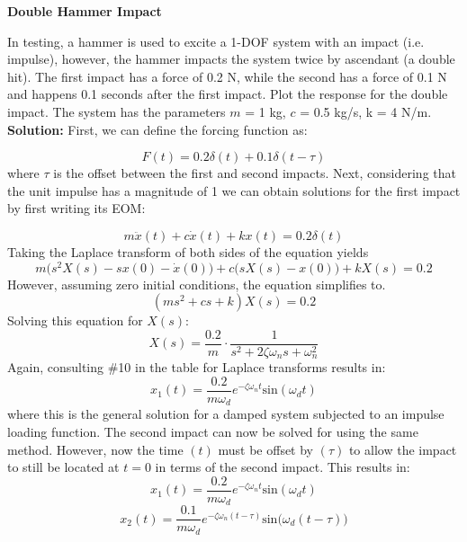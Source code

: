 \documentclass[12pt,letter]{article}
\begin{document}
\begin{example}
\label{example:Double_Hammer_Impact}
	\textbf{Double Hammer Impact}

	\noindent In testing, a hammer is used to excite a 1-DOF system with an impact (i.e. impulse), however, the hammer impacts the system twice by ascendant (a double hit). The first impact has a force of 0.2 N, while the second has a force of 0.1 N and happens 0.1 seconds after the first impact. Plot the response for the double impact. The system has the parameters $m$ = 1 kg, $c$ = 0.5 kg/s, k = 4 N/m. \\
	
	\noindent\textbf{Solution:} 
	\noindent First, we can define the forcing function as:
	
	\begin{equation}
		F(t) = 0.2 \delta (t) + 0.1 \delta(t-\tau)
	\end{equation}
	where $\tau$ is the offset between the first and second impacts. Next, considering that the unit impulse has a magnitude of 1 we can obtain solutions for the first impact by first writing its EOM:
	
	\begin{equation}
		m\ddot{x}(t) +c\dot{x}(t) +kx(t) =0.2 \delta(t)
	\end{equation}
	Taking the Laplace transform of both sides of the equation yields 
	\begin{equation}
		m\big(s^2X(s)-sx(0) - \dot{x}(0)\big) + c\big(sX(s)-x(0)\big) +kX(s) = 0.2
	\end{equation}
	However, assuming zero initial conditions, the equation simplifies to. 
	\begin{equation}
		(ms^2 + cs +k)X(s) = 0.2
	\end{equation}
	Solving this equation for $X(s)$:
	\begin{equation}
		X(s) = \frac{0.2}{m} \cdot \frac{1}{s^2 + 2 \zeta \omega_n s + \omega_n^2}
	\end{equation}
	Again, consulting \#10 in the table for Laplace transforms results in:
	\begin{equation}
		x_1(t) = \frac{0.2}{m \omega_d} e^{-\zeta \omega_n t} \text{sin}(\omega_dt)
	\end{equation}
	where this is the general solution for a damped system subjected to an impulse loading function. The second impact can now be solved for using the same method. However, now the time $(t)$ must be offset by $(\tau)$ to allow the impact to still be located at $t=0$ in terms of the second impact. This results in:
	\begin{equation}
		x_1(t) = \frac{0.2}{m \omega_d} e^{-\zeta \omega_n t} \text{sin}(\omega_dt)
	\end{equation}
	\begin{equation}
		x_2(t) = \frac{0.1}{m \omega_d} e^{-\zeta \omega_n (t-\tau)} \text{sin}\big(\omega_d(t-\tau)\big)
	\end{equation}


\end{example}
\end{document}
